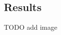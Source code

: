 \documentclass[conference]{IEEEtran}
\begin{document}
\subsection{Results}
TODO add image
\\
\\
\\
\\
\\
\\
\\
\\
\\
\\
\\
\\
\\
\\
\\
\\
\\
\\
\\
\\
\\
\\
\\
\\
\\
\\
\\
\\
\\
\\
\\
\\
\\
\\
\\
\\
\\
\\
\\
\\
\\
\\
\\
\\
\\
\\
\\
\\
\\
\\
\\
\\
\\
\\
\\
\\
\end{document}
